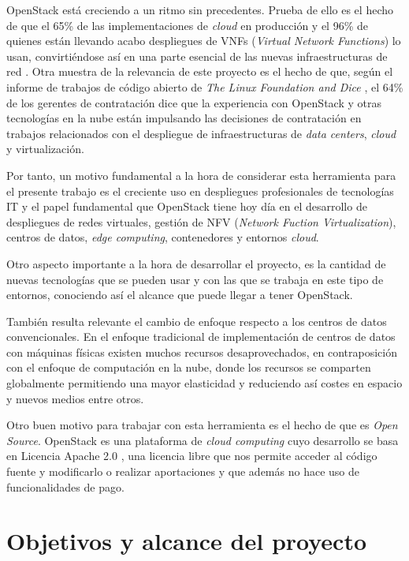 OpenStack está creciendo a un ritmo sin precedentes. Prueba de ello es el hecho de que el 65\% de las implementaciones de \textit{cloud} en  producción y el 96\% de quienes están llevando acabo despliegues de VNFs (\textit{Virtual Network Functions}) lo usan, convirtiéndose así en una parte esencial de las nuevas infraestructuras de red \cite{noauthor_openstack-annualreport2017.pdf_nodate}. Otra muestra de la relevancia de este proyecto es el hecho de que, según el informe de trabajos de código abierto de \textit{The Linux Foundation and Dice} \cite{foundation_new_2018}, el 64\% de los gerentes de contratación dice que la experiencia con OpenStack y otras tecnologías en la nube están impulsando las decisiones de contratación en trabajos relacionados con el despliegue de infraestructuras de \textit{data centers}, \textit{cloud} y virtualización.

Por tanto, un motivo fundamental a la hora de considerar esta herramienta para el presente trabajo es el creciente uso en despliegues profesionales de tecnologías IT y el papel fundamental que OpenStack tiene hoy día en el desarrollo de despliegues de redes virtuales, gestión de NFV (\textit{Network Fuction Virtualization}), centros de datos, \textit{edge computing}, contenedores y entornos \textit{cloud}.

Otro aspecto importante a la hora de desarrollar el proyecto, es la cantidad de nuevas tecnologías que se pueden usar y con las que se trabaja en este tipo de entornos, conociendo así el alcance que puede llegar a tener OpenStack.

También resulta relevante el cambio de enfoque respecto a los centros de datos convencionales. En el enfoque tradicional de implementación de centros de datos con máquinas físicas existen muchos recursos desaprovechados, en contraposición con el enfoque de computación en la nube, donde los recursos se comparten globalmente permitiendo una mayor elasticidad y reduciendo así costes en espacio y nuevos medios entre otros.

Otro buen motivo para trabajar con esta herramienta es el hecho de que es \textit{Open Source}. OpenStack es una plataforma de \textit{cloud computing} cuyo desarrollo se basa en Licencia Apache 2.0 \cite{noauthor_open_nodate}, una licencia libre que nos permite acceder al código fuente y modificarlo o realizar aportaciones y que además no hace uso de funcionalidades de pago.

\section{Objetivos y alcance del proyecto}

